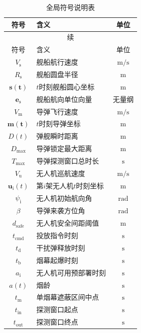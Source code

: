 \documentclass[withoutpreface,bwprint]{cumcmthesis}
\begin{document}
\begin{longtable}{c m{} c}
	\caption{全局符号说明表}
	\label{tab:symbol} \\
	\toprule
	符号 & 含义 & 单位 \\
	\midrule
	\endfirsthead %
	\multicolumn{3}{c}{续\tablename} \\
	\toprule
	符号 & 含义 & 单位 \\
	\midrule
	\endhead %
	\bottomrule
	\endfoot %
	\bottomrule
	\endlastfoot %
	
	$V_{\mathrm{s}}$ & 舰船航行速度 & $\mathrm{m/s}$ \\
	$R_{\mathrm{s}}$ & 舰船圆盘半径 & $\mathrm{m}$ \\
	$\bm{s(t)}$ & $t$时刻舰船圆心坐标 & $\mathrm{m}$ \\
	$\bm{e}_{\mathrm{s}}$ & 舰船航向单位向量 & 无量纲 \\
	$V_{\mathrm{m}}$ & 导弹飞行速度 & $\mathrm{m/s}$ \\
	$\bm{m(t)}$ & $t$时刻导弹坐标 & $\mathrm{m}$ \\
	$D(t)$ & 弹舰瞬时距离 & $\mathrm{m}$ \\
	$D_{\max}$ & 导弹锁定最大距离 & $\mathrm{m}$ \\
	$T_{\max}$ & 导弹探测窗口总时长 & $\mathrm{s}$ \\
	$V_{\mathrm{u}}$ & 无人机巡航速度 & $\mathrm{m/s}$ \\
	$\bm{u_{\mathrm{i}}}(t)$ & 第$i$架无人机$t$时刻坐标 & $\mathrm{m}$ \\
	$\psi_{\mathrm{i}}$ & 无人机初始航向角 & $\mathrm{rad}$ \\
	$\beta$ & 导弹来袭方位角 & $\mathrm{rad}$ \\
	$d_{\mathrm{safe}}$ & 无人机安全间距阈值 & $\mathrm{m}$ \\
	$t_{\mathrm{cmd}}$ & 投放指令时刻 & $\mathrm{s}$ \\
	$t_{\mathrm{d}}$ & 干扰弹释放时刻 & $\mathrm{s}$ \\
	$t_{\mathrm{b}}$ & 烟幕起爆时刻 & $\mathrm{s}$ \\
	$a_{\mathrm{i}}$ & 无人机可用预部署时刻 & $\mathrm{s}$ \\
	$a(t)$ & 烟龄 & $\mathrm{s}$ \\
	$t_{\mathrm{m}}$ & 单烟幕遮蔽区间中点 & $\mathrm{s}$ \\
	$t_{\mathrm{in}}$ & 探测窗口起点 & $\mathrm{s}$ \\
	$t_{\mathrm{out}}$ & 探测窗口终点 & $\mathrm{s}$ \\

\end{longtable}
\end{document}
